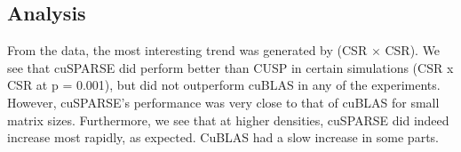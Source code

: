 \documentclass[12pt]{article}
\begin{document}

\subsection{Analysis}
\hspace{0.5cm}From the data, the most interesting trend was generated by (CSR $\times$ CSR). We see that cuSPARSE did perform better than CUSP in certain simulations (CSR x CSR at p = 0.001), but did not outperform cuBLAS in any of the experiments. However, cuSPARSE's performance was very close to that of cuBLAS for small matrix sizes. Furthermore, we see that at higher densities, cuSPARSE did indeed increase most rapidly, as expected. CuBLAS had a slow increase in some parts. 
\end{document}
